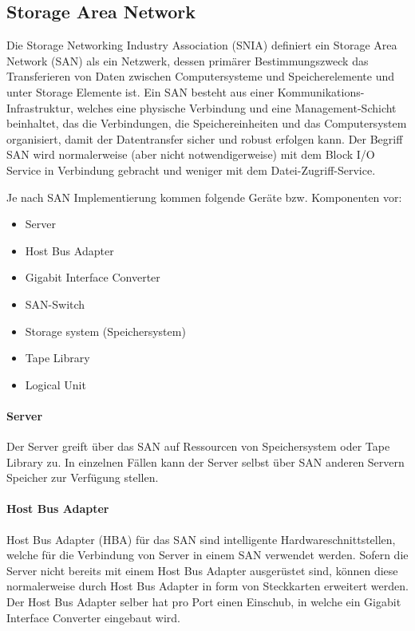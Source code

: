 \subsection{Storage Area Network}
Die Storage Networking Industry Association (\gls{SNIA}) definiert ein Storage Area Network (SAN) als ein Netzwerk, dessen primärer Bestimmungszweck das Transferieren von Daten zwischen Computersysteme und Speicherelemente und unter Storage Elemente ist. Ein SAN besteht aus einer Kommunikations-Infrastruktur, welches eine physische Verbindung und eine Management-Schicht beinhaltet, das die Verbindungen, die Speichereinheiten und das Computersystem organisiert, damit der Datentransfer sicher und robust erfolgen kann. Der Begriff SAN wird normalerweise (aber nicht notwendigerweise) mit dem Block I/O Service in Verbindung gebracht und weniger mit dem Datei-Zugriff-Service. \cite{SNIA2011}

Je nach SAN Implementierung kommen folgende Geräte bzw. Komponenten vor:
\begin{itemize}
\item Server
\item Host Bus Adapter
\item Gigabit Interface Converter
\item SAN-Switch
\item Storage system (Speichersystem)
\item Tape Library
\item Logical Unit
\end{itemize}

\paragraph*{Server} 
Der Server greift über das SAN auf Ressourcen von Speichersystem oder Tape Library zu. In einzelnen Fällen kann der Server selbst über SAN anderen Servern Speicher zur Verfügung stellen.

\paragraph*{Host Bus Adapter}
Host Bus Adapter (HBA) für das SAN sind intelligente Hardwareschnittstellen, welche für die Verbindung von Server in einem SAN verwendet werden. Sofern die Server nicht bereits mit einem Host Bus Adapter ausgerüstet sind, können diese normalerweise durch Host Bus Adapter in form von Steckkarten erweitert werden. Der Host Bus Adapter selber hat pro Port einen Einschub, in welche ein Gigabit Interface Converter eingebaut wird. \cite{Christopher2009}

